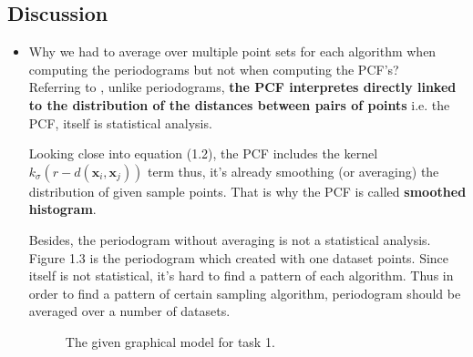\documentclass[paper=a4, fontsize=11pt]{scrartcl} %
\numberwithin{equation}{section} %
\numberwithin{figure}{section} %
\numberwithin{table}{section} %
\renewcommand{\vec}[1]{\mathbf{#1}}
\begin{document}
\pagebreak

\subsection{Discussion}

\begin{itemize}
	\item Why we had to average over multiple point sets for each algorithm when computing the periodograms but not when computing the PCF's? \\
	
	Referring to \cite{oztireli2012analysis}, unlike periodograms, \textbf{the PCF interpretes directly linked to the distribution of the distances between pairs of points} i.e. the PCF, itself is statistical analysis. 
	
	Looking close into equation (1.2), the PCF includes the kernel $k_\sigma (r - d(\vec{x}_i, \vec{x}_j))$ term thus, it's already smoothing (or averaging) the distribution of given sample points. That is why the PCF is called \textbf{smoothed histogram}. 
	
	Besides, the periodogram without averaging is not a statistical analysis. Figure 1.3 is the periodogram which created with one dataset points. Since itself is not statistical, it's hard to find a pattern of each algorithm. Thus in order to find a pattern of certain sampling algorithm, periodogram should be averaged over a number of datasets.   
	
	\begin{figure}[t]
	\caption{The given graphical model for task 1.\label{fig:simple}}
	\noindent{}
	\end{figure}
	

\end{itemize}
\end{document}
